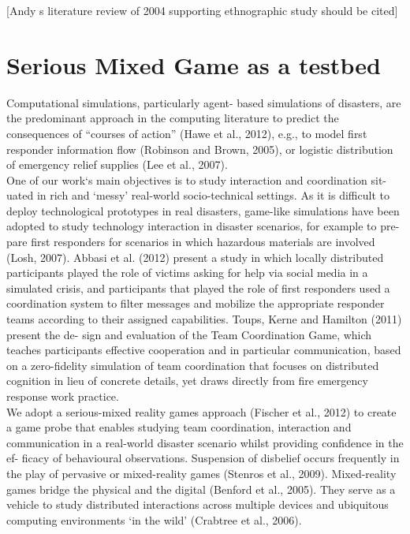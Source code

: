[Andy s literature review of 2004 supporting ethnographic study should be cited]\\


\section{Serious Mixed Game as a testbed}

Computational simulations, particularly agent- based simulations of disasters, are the predominant approach in the computing literature to predict the consequences of ``courses of action'' (Hawe et al., 2012), e.g., to model first responder information flow (Robinson and Brown, 2005), or logistic distribution of emergency relief supplies (Lee et al., 2007).\\

One of our work`s main objectives is to study interaction and coordination sit- uated in rich and `messy' real-world socio-technical settings. As it is difficult to deploy technological prototypes in real disasters, game-like simulations have been adopted to study technology interaction in disaster scenarios, for example to pre- pare first responders for scenarios in which hazardous materials are involved (Losh, 2007). Abbasi et al. (2012) present a study in which locally distributed participants played the role of victims asking for help via social media in a simulated crisis, and participants that played the role of first responders used a coordination system to filter messages and mobilize the appropriate responder teams according to their assigned capabilities. Toups, Kerne and Hamilton (2011) present the de- sign and evaluation of the Team Coordination Game, which teaches participants effective cooperation and in particular communication, based on a zero-fidelity simulation of team coordination that focuses on distributed cognition in lieu of concrete details, yet draws directly from fire emergency response work practice.\\

We adopt a serious-mixed reality games approach (Fischer et al., 2012) to create a game probe that enables studying team coordination, interaction and communication in a real-world disaster scenario whilst providing confidence in the ef- ficacy of behavioural observations. Suspension of disbelief occurs frequently in the play of pervasive or mixed-reality games (Stenros et al., 2009). Mixed-reality games bridge the physical and the digital (Benford et al., 2005). They serve as a vehicle to study distributed interactions across multiple devices and ubiquitous computing environments `in the wild' (Crabtree et al., 2006).\\

